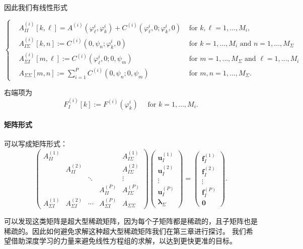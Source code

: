 因此我们有线性形式

$$\left\{\begin{aligned}
    &A_{I I}^{(i)}[k, \ell]  =A^{(i)}\left(\varphi_{\ell}^{i}, \varphi_{k}^{i}\right)+C^{(i)}\left(\varphi_{\ell}^{i}, 0 ; \varphi_{k}^{i}, 0\right) & \text { for } k, \ell=1, \ldots, M_{i}, \\
    &A_{I \Sigma}^{(i)}[k, n]:=C^{(i)}\left(0, \psi_{n} ; \varphi_{k}^{i}, 0\right) & \text { for } k=1, \ldots, M_{i} \text { and } n=1, \ldots, M_{\Sigma} \\
    &A_{\Sigma I}^{(i)}[m, \ell]  :=C^{(i)}\left(\varphi_{\ell}^{i}, 0 ; 0, \psi_{m}\right) & \text { for } m=1, \ldots, M_{\Sigma} \text { and } \ell=1, \ldots, M_{i}\\
    &A_{\Sigma \Sigma}[m, n]:=\sum_{i=1}^{P} C^{(i)}\left(0, \psi_{n} ; 0, \psi_{m}\right) & \text { for } m, n=1, \ldots, M_{\Sigma} .
\end{aligned}\right.$$
    
右端项为
$$F_{I}^{(i)}[k]:=F^{(i)}\left(\varphi_{k}^{i}\right) \quad \text { for } k=1, \ldots, M_{i} .$$

\paragraph*{矩阵形式}
可以写成矩阵形式：
$$\left(\begin{array}{ccccc}
    A_{I I}^{(1)} & & & & A_{I \Sigma}^{(1)} \\
    & A_{I I}^{(2)} & & & A_{I \Sigma}^{(2)} \\
    & & \ddots & & \vdots \\
    & & & A_{I I}^{(P)} & A_{I \Sigma}^{(P)} \\
    A_{\Sigma I}^{(1)} & A_{\Sigma I}^{(2)} & \cdots & A_{\Sigma I}^{(P)} & A_{\Sigma \Sigma}
    \end{array}\right)\left(\begin{array}{c}
    \boldsymbol{u}_{I}^{(1)} \\
    \boldsymbol{u}_{I}^{(2)} \\
    \vdots \\
    \boldsymbol{u}_{I}^{(P)} \\
    \boldsymbol{\lambda}_{\Sigma}
    \end{array}\right)=\left(\begin{array}{c}
    \boldsymbol{f}_{I}^{(1)} \\
    \boldsymbol{f}_{I}^{(2)} \\
    \vdots \\
    \boldsymbol{f}_{I}^{(P)} \\
    \mathbf{0}
\end{array}\right) .$$

可以发现这类矩阵是超大型稀疏矩阵，因为每个子矩阵都是稀疏的，且子矩阵也是稀疏的。因此如何避免求解这种超大型稀疏矩阵我们在第三章进行探讨。
我们希望借助深度学习的力量来避免线性方程组的求解，以达到更快更准的目标。
